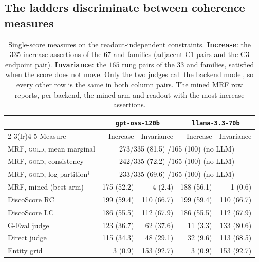 \subsection{The ladders discriminate between coherence measures}
\label{sec-measures}

\begin{table}[t]
\centering\small
\caption{Single-score measures on the readout-independent constraints. \textbf{Increase}: the $335$ increase
  assertions of the $67$  and  families (adjacent C1 pairs and the C3 endpoint
  pair). \textbf{Invariance}: the $165$ rung pairs of the $33$  and  families,
  satisfied when the score does not move. Only the two judges call the backend model, so every other row is the
  same in both column pairs. The mined MRF row reports, per backend, the mined arm and readout with the most
  increase assertions.}
\label{tab:baselines}
\begin{tabular}{@{}lrrrr@{}}
\toprule
 & \multicolumn{2}{c}{\texttt{gpt-oss-120b}} & \multicolumn{2}{c}{\texttt{llama-3.3-70b}} \\
\cmidrule(lr){2-3}\cmidrule(lr){4-5}
Measure & Increase & Invariance & Increase & Invariance \\
\midrule
MRF, \textsc{gold}, mean marginal          & \multicolumn{4}{c}{273/335 (81.5) \quad 165/165 (100) \quad (no LLM)} \\
MRF, \textsc{gold}, consistency            & \multicolumn{4}{c}{242/335 (72.2) \quad 165/165 (100) \quad (no LLM)} \\
MRF, \textsc{gold}, log partition$^\dagger$ & \multicolumn{4}{c}{233/335 (69.6) \quad 165/165 (100) \quad (no LLM)} \\
MRF, mined (best arm)                      & 175 (52.2) &   4 (2.4)  & 188 (56.1) &   1 (0.6)  \\
\midrule
DiscoScore RC                              & 199 (59.4) & 110 (66.7) & 199 (59.4) & 110 (66.7) \\
DiscoScore LC                              & 186 (55.5) & 112 (67.9) & 186 (55.5) & 112 (67.9) \\
G-Eval judge                               & 123 (36.7) &  62 (37.6) &  11 (3.3)  & 133 (80.6) \\
Direct judge                               & 115 (34.3) &  48 (29.1) &  32 (9.6)  & 113 (68.5) \\
Entity grid                                &   3 (0.9)  & 153 (92.7) &   3 (0.9)  & 153 (92.7) \\

\end{tabular}
\end{table}
